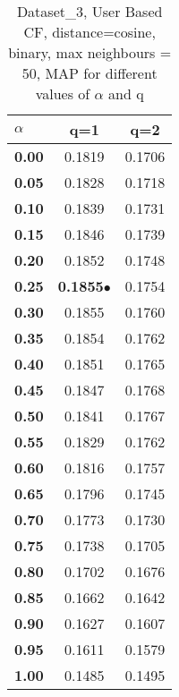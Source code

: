 \begin{table}
\begin{center}
\begin{tabular}{ | l || c | c |}
\hline
\textbf{$\alpha$} & \textbf{q=1} & \textbf{q=2} \\
\hline
\textbf{0.00} & 0.1819 & 0.1706\\
\hline
\textbf{0.05} & 0.1828 & 0.1718\\
\hline
\textbf{0.10} & 0.1839 & 0.1731\\
\hline
\textbf{0.15} & 0.1846 & 0.1739\\
\hline
\textbf{0.20} & 0.1852 & 0.1748\\
\hline
\textbf{0.25} & \textbf{0.1855}$\bullet$ & 0.1754\\
\hline
\textbf{0.30} & 0.1855 & 0.1760\\
\hline
\textbf{0.35} & 0.1854 & 0.1762\\
\hline
\textbf{0.40} & 0.1851 & 0.1765\\
\hline
\textbf{0.45} & 0.1847 & 0.1768\\
\hline
\textbf{0.50} & 0.1841 & 0.1767\\
\hline
\textbf{0.55} & 0.1829 & 0.1762\\
\hline
\textbf{0.60} & 0.1816 & 0.1757\\
\hline
\textbf{0.65} & 0.1796 & 0.1745\\
\hline
\textbf{0.70} & 0.1773 & 0.1730\\
\hline
\textbf{0.75} & 0.1738 & 0.1705\\
\hline
\textbf{0.80} & 0.1702 & 0.1676\\
\hline
\textbf{0.85} & 0.1662 & 0.1642\\
\hline
\textbf{0.90} & 0.1627 & 0.1607\\
\hline
\textbf{0.95} & 0.1611 & 0.1579\\
\hline
\textbf{1.00} & 0.1485 & 0.1495\\
\hline
\end{tabular}
\caption{Dataset\_3, User Based CF, distance=cosine, binary, max neighbours = 50, MAP for different values of $\alpha$ and q}
\label{table:MAP_Dataset_3_ucf_cosine_binary_mnn=50}
\end{center}
\end{table}
